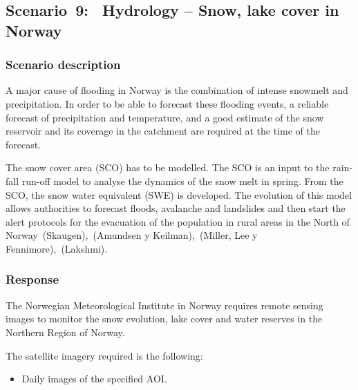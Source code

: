 \documentclass[a4paper]{article}
\newcommand\liststyleLFOix{%
\renewcommand\labelitemi{[F0B7?]}
\renewcommand\labelitemii{o}
\renewcommand\labelitemiii{[F0A7?]}
\renewcommand\labelitemiv{[F0B7?]}
}
\begin{document}
\subsection[Scenario\ 9: \ Hydrology {}-- Snow, lake cover in
Norway]{Scenario\ 9: \ Hydrology -- Snow, lake cover in Norway}
\hypertarget{Toc381777282}{}\subsubsection[Scenario
description]{ Scenario description}
\hypertarget{Toc381777283}{}{
A major cause of flooding in Norway is the combination of intense
snowmelt and precipitation. In order to be able to forecast these
flooding events, a reliable forecast of precipitation and temperature,
and a good estimate of the snow reservoir and its coverage in the
catchment are required at the time of the forecast.}


\bigskip

\foreignlanguage{english}{The snow cover area (SCO) has to be modelled.
The SCO is an input to the rainfall run-off model to analyse the
dynamics of the snow melt in spring. From the SCO, the snow water
equivalent (SWE) is developed. The evolution of this model allows
authorities to forecast floods, avalanche and landslides and then start
the alert protocols for the evacuation of the population in rural areas
in the North of
Norway\ }(Skaugen)\foreignlanguage{english}{,\ }(Amundsen y
Keilman)\foreignlanguage{english}{,\ }(Miller, Lee y
Fennimore)\foreignlanguage{english}{,\ }(Lakshmi)\foreignlanguage{english}{.}


\bigskip

\subsubsection[Response]{ Response}
\hypertarget{Toc381777284}{}{
The Norwegian Meteorological Institute in Norway requires remote sensing
images to monitor the snow evolution, lake cover and water reserves in
the Northern Region of Norway.\ }

{
The satellite imagery required is the following:}

\liststyleLFOix
\begin{itemize}
\item {
Daily images of the specified AOI.}
\end{itemize}
\end{document}
